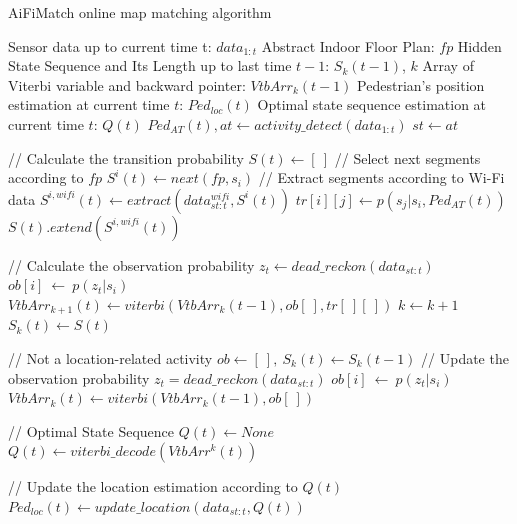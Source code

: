 \documentclass{llncs}
\begin{document}
\begin{algorithm}[H]
	\caption{AiFiMatch online map matching algorithm}
	\label{alg_aifi}
	\begin{algorithmic}[1]
		\renewcommand{\algorithmicrequire}{\textbf{Input:}}
		\renewcommand{\algorithmicensure}{\textbf{Output:}}
		\REQUIRE Sensor data up to current time t: $data_{1:t}$
		\REQUIRE Abstract Indoor Floor Plan: $fp$
		\REQUIRE Hidden State Sequence and Its Length up to last time $t-1$: $S_{k}(t-1)$, $k$
		\REQUIRE Array of Viterbi variable and backward pointer: ${VtbArr}_{k}(t-1)$
		\ENSURE Pedestrian's position estimation at current time $t$: $Ped_{loc}(t)$
		\ENSURE Optimal state sequence estimation at current time $t$: $Q(t)$
		\STATE ${Ped_{AT}(t)}, at \leftarrow activity\_detect({data_{1:t}})$
		\STATE ${st} \leftarrow {at}$  
		
		\STATE // Calculate the transition probability
		\STATE $S(t) \leftarrow [\ ]$
		\STATE // Select next segments according to $fp$
		\STATE $S^{i}(t) \leftarrow next(fp,s_i)$
		\STATE // Extract segments according to Wi-Fi data
		\STATE $S^{i,wifi}(t) \leftarrow extract(data_{st:t}^{wifi},S^{i}(t))$
		\STATE $tr[i][j] \leftarrow p(s_j|s_i,{Ped_{AT}(t)})$
		\ENDFOR
		\STATE $S(t).extend(S^{i,wifi}(t))$
		\ENDFOR
		
		\STATE // Calculate the observation probability		    
		\STATE ${z_t} \leftarrow dead\_reckon(data_{st:t})$
		\STATE $ob[i]\ \leftarrow\ p(z_t|s_i)$
		\ENDFOR
		\STATE ${VtbArr}_{k+1}(t) \leftarrow viterbi({VtbArr}_{k}(t-1), ob[\ ], tr[\ ][\ ])$
		\STATE $k \leftarrow k+1$
		\STATE $S_{k}(t) \leftarrow S(t)$
		
				
	\end{algorithmic}
\end{algorithm}

\begin{algorithm}
	\begin{algorithmic}[1]
				
		\ELSE // Not a location-related activity
		\STATE $ob \leftarrow [\ ],\ S_{k}(t) \leftarrow S_{k}(t-1)$
		\STATE // Update the observation probability
		\STATE ${z_t}=dead\_reckon(data_{st:t})$
		\STATE $ob[i]\ \leftarrow\ p(z_t|s_i)$
		\ENDFOR
		\STATE ${VtbArr}_{k}(t) \leftarrow viterbi({VtbArr}_{k}(t-1), ob[\ ])$
		\ENDIF	

		\STATE // Optimal State Sequence
		\STATE ${Q(t)} \leftarrow None$
		\STATE ${Q(t)} \leftarrow viterbi\_decode(VtbArr^{k}(t))$
		\ENDIF
		
		\STATE // Update the location estimation according to $Q(t)$
		\STATE $Ped_{loc}(t) \leftarrow update\_location(data_{st:t}, Q(t))$
	\end{algorithmic}
\end{algorithm}
\end{document}
